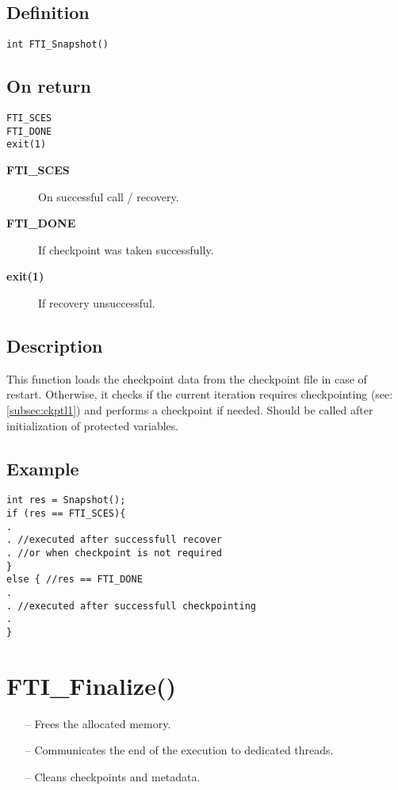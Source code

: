 \documentclass{refrep}
\begin{document}
\subsection*{Definition}
\begin{lstlisting}[frame=single]
int FTI_Snapshot()
\end{lstlisting}
\subsection*{On return}
\begin{lstlisting}[frame=single]
FTI_SCES
FTI_DONE
exit(1)
\end{lstlisting}
\begin{description}
\item[\textbf{FTI\_SCES}] On successful call / recovery.
\item[\textbf{FTI\_DONE}] If checkpoint was taken successfully.
\item[\textbf{exit(1)}] If recovery unsuccessful.
\end{description}
\subsection*{Description}
This function loads the checkpoint data from the checkpoint file in case of restart. Otherwise, it checks if the current iteration requires checkpointing (see: \ref{subsec:ckptl1}) and performs a checkpoint if needed. Should be called after initialization of protected variables.
\subsection*{Example}
\begin{center}
\begin{lstlisting}[frame=single]
int res = Snapshot();
if (res == FTI_SCES){
.
. //executed after successfull recover
. //or when checkpoint is not required
}
else { //res == FTI_DONE
.
. //executed after successfull checkpointing
.
}

\end{lstlisting}
\end{center}
\newpage
\section{\asciifamily FTI\_Finalize()}\label{sec:ftifinalize}
\begin{framed}
\begin{itemize}
\item[--] Frees the allocated memory.
\item[--] Communicates the end of the execution to dedicated threads.
\item[--] Cleans checkpoints and metadata.
\end{itemize}
\end{framed}
\end{document}
